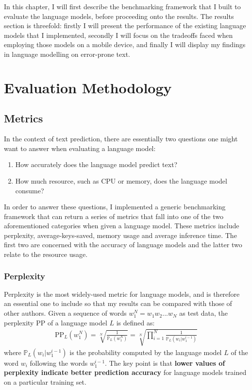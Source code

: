 \documentclass[a4paper, 12pt]{report}
\newcommand{\tbf}[1]{\textbf{#1}}
\begin{document}
In this chapter, I will first describe the benchmarking framework that I built to evaluate the language models, before proceeding onto the results. The results section is threefold: firstly I will present the performance of the existing language models that I implemented, secondly I will focus on the tradeoffs faced when employing those models on a mobile device, and finally I will display my findings in language modelling on error-prone text.

\section{Evaluation Methodology}

\subsection{Metrics}

In the context of text prediction, there are essentially two questions one might want to answer when evaluating a language model:
\begin{enumerate}
\item
	How accurately does the language model predict text?
\item
	How much resource, such as CPU or memory, does the language model consume?
\end{enumerate}

In order to answer these questions, I implemented a generic benchmarking framework that can return a series of metrics that fall into one of the two aforementioned categories when given a language model. These metrics include perplexity, average-keys-saved, memory usage and average inference time. The first two are concerned with the accuracy of language models and the latter two relate to the resource usage.

\subsubsection{Perplexity}

Perplexity is the most widely-used metric for language models, and is therefore an essential one to include so that my results can be compared with those of other authors. Given a sequence of words $w_1^{N} = w_1w_2...w_N$ as test data, the perplexity PP of a language model $L$ is defined as:
\begin{gather}
	\text{PP}_L(w_1^N) = \sqrt[N]{\frac{1}{\mathbb{P}_L(w_1^N)}} = \sqrt[N]{\prod_{i=1}^{N}\frac{1}{\mathbb{P}_L(w_i | w_1^{i-1})}}
\end{gather}
where $\mathbb{P}_L(w_i | w_1^{i-1})$ is the probability computed by the language model $L$ of the word $w_i$ following the words $w_1^{i-1}$. The key point is that \tbf{lower values of perplexity indicate better prediction accuracy} for language models trained on a particular training set. \\
\end{document}
